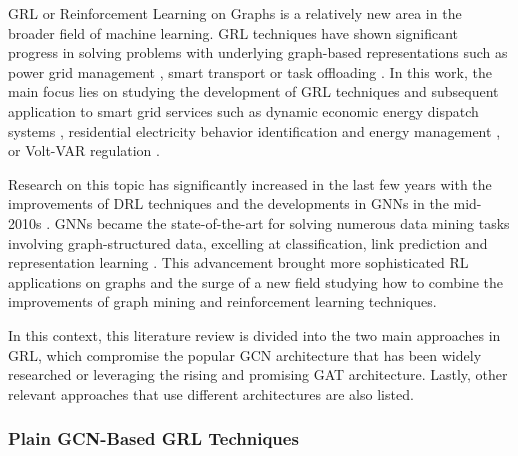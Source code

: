 \documentclass[11pt,a4paper]{article}
\begin{document}
\ac{GRL} or Reinforcement Learning on Graphs is a relatively new area in the broader field of machine learning. \ac{GRL} techniques have shown significant progress in solving problems with underlying graph-based representations such as power grid management \cite{liNovelGraphReinforcement2022, chenGraphRepresentationLearningbased2023}, smart transport \cite{xingBilevelGraphReinforcement2023, almasanDeepReinforcementLearning2022} or task offloading \cite{gaoFastAdaptiveTask2023, liGraphReinforcementLearningbased2022}. In this work, the main focus lies on studying the development of \ac{GRL} techniques and subsequent application to smart grid services such as dynamic economic energy dispatch systems \cite{chenScalableGraphReinforcement2023, xingRealtimeOptimalScheduling2023}, residential electricity behavior identification and energy management \cite{chenGraphRepresentationLearningbased2023}, or Volt-VAR regulation \cite{huMultiagentGraphReinforcement2024}.  \par
Research on this topic has significantly increased in the last few years with the improvements of \ac{DRL} techniques and the developments in \acp{GNN} in the mid-2010s \cite{kipfSemiSupervisedClassificationGraph2017, velickovicGraphAttentionNetworks2018, liGatedGraphSequence2016, gaoGraphUNets2019}. \acp{GNN} became the state-of-the-art for solving numerous data mining tasks involving graph-structured data, excelling at classification, link prediction and representation learning \cite{xuHowPowerfulAre2019, nieReinforcementLearningGraphs2023}. This advancement brought more sophisticated \ac{RL} applications on graphs and the surge of a new field studying how to combine the improvements of graph mining and reinforcement learning techniques. \par
In this context, this literature review is divided into the two main approaches in \ac{GRL}, which compromise the popular \ac{GCN} architecture that has been widely researched or leveraging the rising and promising \ac{GAT} architecture. Lastly, other relevant approaches that use different architectures are also listed.


\subsubsection{Plain GCN-Based GRL Techniques}
\end{document}
